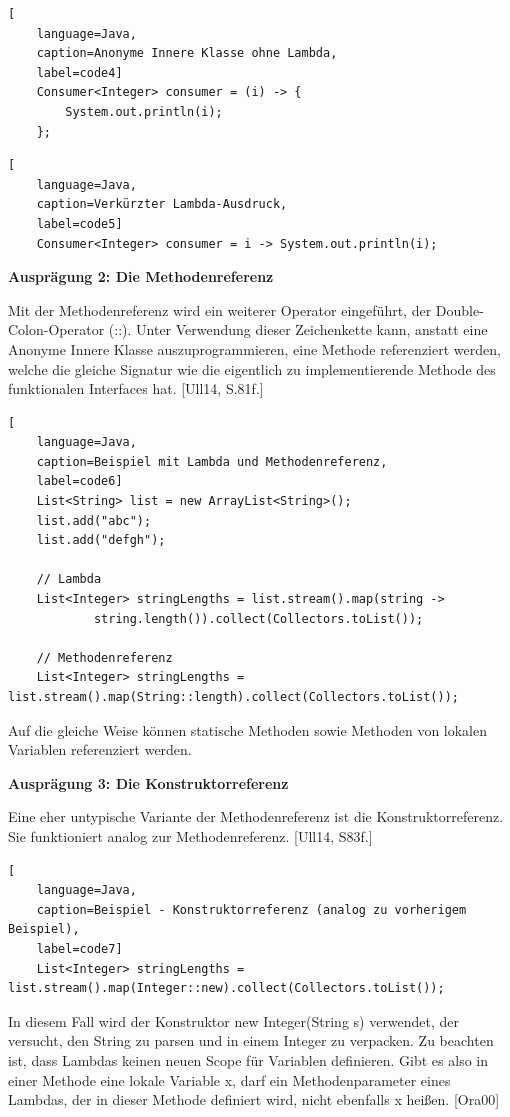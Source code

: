 \begin{lstlisting}[
    language=Java,
    caption=Anonyme Innere Klasse ohne Lambda,
    label=code4]
	Consumer<Integer> consumer = (i) -> {
		System.out.println(i);
	};
\end{lstlisting}  

\begin{lstlisting}[
    language=Java,
    caption=Verkürzter Lambda-Ausdruck,
    label=code5]
	Consumer<Integer> consumer = i -> System.out.println(i);	
\end{lstlisting}  

\textbf{Ausprägung 2: Die Methodenreferenz}

Mit der Methodenreferenz wird ein weiterer Operator eingeführt, der Double-Colon-Operator (::). Unter Verwendung dieser Zeichenkette kann, anstatt eine Anonyme Innere Klasse auszuprogrammieren, eine Methode referenziert werden, welche die gleiche Signatur wie die eigentlich zu implementierende Methode des funktionalen Interfaces hat. [Ull14, S.81f.]

\begin{lstlisting}[
    language=Java,
    caption=Beispiel mit Lambda und Methodenreferenz,
    label=code6]
	List<String> list = new ArrayList<String>();
	list.add("abc");
	list.add("defgh");	
	
	// Lambda
	List<Integer> stringLengths = list.stream().map(string ->
			string.length()).collect(Collectors.toList());	
	
	// Methodenreferenz
	List<Integer> stringLengths = list.stream().map(String::length).collect(Collectors.toList());
\end{lstlisting}  


Auf die gleiche Weise können statische Methoden sowie Methoden von lokalen Variablen referenziert werden.

\textbf{Ausprägung 3: Die Konstruktorreferenz}

Eine eher untypische Variante der Methodenreferenz ist die Konstruktorreferenz. Sie funktioniert analog zur Methodenreferenz. [Ull14, S83f.]

\begin{lstlisting}[
    language=Java,
    caption=Beispiel - Konstruktorreferenz (analog zu vorherigem Beispiel),
    label=code7]
	List<Integer> stringLengths = list.stream().map(Integer::new).collect(Collectors.toList());
\end{lstlisting} 

In diesem Fall wird der Konstruktor new Integer(String s) verwendet, der versucht, den String zu parsen und in einem Integer zu verpacken.
Zu beachten ist, dass Lambdas keinen neuen Scope für Variablen definieren. Gibt es also in einer Methode eine lokale Variable x, darf ein Methodenparameter eines Lambdas, der in dieser Methode definiert wird, nicht ebenfalls x heißen. [Ora00]


